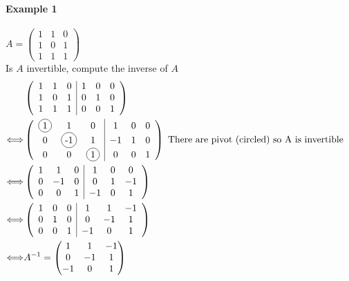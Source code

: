 \documentclass[notitlepage]{math}
\begin{document}
\paragraph{Example 1}
$A = \begin{pmatrix} 1 & 1 & 0 \\ 1 & 0 & 1 \\ 1 & 1 & 1 \end{pmatrix}$ \\
 Is $A$ invertible, compute the inverse of $A$ \\
\begin{align*}
    & \left( \begin{array}{ccc|ccc}
        1 & 1 & 0 & 1 & 0 & 0 \\
        1 & 0 & 1 & 0 & 1 & 0 \\
        1 & 1 & 1 & 0 & 0 & 1 \\
    \end{array}\right)  \\ \Longleftrightarrow &
    \left( \begin{array}{ccc|ccc}
        \circled{1} & 1 & 0 & 1 & 0 & 0 \\
        0 & \circled{-1} & 1 & -1 & 1 & 0 \\
        0 & 0 & \circled{1} & 0 & 0 & 1 \\
    \end{array}\right)  
     \text{  There are pivot (circled) so A is invertible}\\
    \Longleftrightarrow&
    \left( \begin{array}{ccc|ccc}
        1 & 1 & 0 & 1 & 0 & 0 \\
        0 & -1 & 0 & 0 & 1 & -1 \\
        0 & 0 & 1 & -1 & 0 & 1 \\
    \end{array}\right)&  \\
    \Longleftrightarrow& 
    \left( \begin{array}{ccc|ccc}
        1 & 0 & 0 & 1 & 1 & -1 \\
        0 & 1 & 0 & 0 & -1 & 1 \\
        0 & 0 & 1 & -1 & 0 & 1 \\
    \end{array}\right)  \\
    \Longleftrightarrow& A^{-1} = \begin{pmatrix} 1 & 1 & -1 \\ 0 & -1 & 1 \\ -1 & 0 & 1 \end{pmatrix}
\end{align*}
\end{document}
